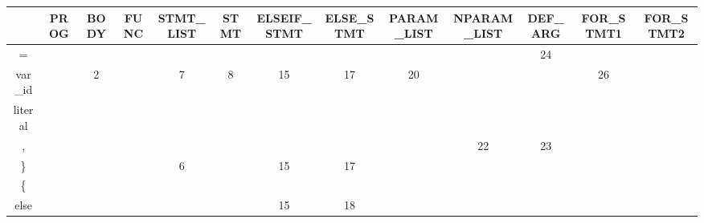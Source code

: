 \documentclass[12pt,a4paper,titlepage,final]{article}
\begin{document}
    \clearpage%
    \thispagestyle{empty}%
    \begin{landscape}%
\begin{table}
    \begin{small}
    \begin{tabular}{|c|c|c|c|c|c|c|c|c|c|c|c|c|} \hline
    ~        & {\scriptsize PROG \par} & {\scriptsize BODY \par} & {\scriptsize FUNC \par} & {\scriptsize STMT\_LIST \par} & {\scriptsize STMT \par} & {\scriptsize ELSEIF\_STMT \par} & {\scriptsize ELSE\_STMT \par} & {\scriptsize PARAM\_LIST \par} & {\scriptsize NPARAM\_LIST \par} & {\scriptsize DEF\_ARG \par} & {\scriptsize FOR\_STMT1 \par} & {\scriptsize FOR\_STMT2 \par} \\ \hline
    =       & ~    & ~    & ~    & ~         & ~    & ~           & ~         & ~          & ~           & 24      & ~         & ~         \\ \hline
    var\_id  & ~    & 2    & ~    & 7         & 8    & 15          & 17        & 20         & ~           & ~       & 26        & ~         \\ \hline
    literal  & ~    & ~    & ~    & ~         & ~    & ~           & ~         & ~          & ~           & ~       & ~         & ~         \\ \hline
    ,       & ~    & ~    & ~    & ~         & ~    & ~           & ~         & ~          & 22          & 23      & ~         & ~         \\ \hline
    \}       & ~    & ~    & ~    & 6         & ~    & 15          & 17        & ~          & ~           & ~       & ~         & ~         \\ \hline
    \{       & ~    & ~    & ~    & ~         & ~    & ~           & ~         & ~          & ~           & ~       & ~         & ~         \\ \hline
    else     & ~    & ~    & ~    & ~         & ~    & 15          & 18        & ~          & ~           & ~       & ~         & ~         \\ \hline

\end{tabular}
\end{small}
\end{table}
\end{landscape}
\end{document}
